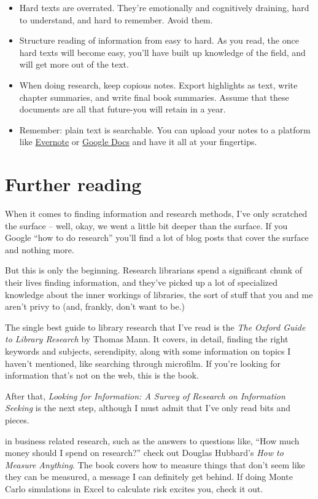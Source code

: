 \begin{itemize}
\item Hard texts are overrated. They're emotionally and cognitively draining, hard to
understand, and hard to remember. Avoid them.

\item Structure reading of information from easy to hard. As you read, the once hard
texts will become easy, you'll have built up knowledge of the field, and will
get more out of the text.

\item When doing research, keep copious notes. Export highlights as text, write
chapter summaries, and write final book summaries. Assume that these documents
are all that future-you will retain in a year.

\item Remember: plain text is searchable. You can upload your notes to a platform
like \href{http://evernote.com/}{Evernote} or \href{http://docs.google.com}{Google Docs} and have it all at your fingertips.
\end{itemize}

\section{Further reading}

When it comes to finding information and research methods, I've only scratched
the surface -- well, okay, we went a little bit deeper than the surface. If you
Google ``how to do research'' you'll find a lot of blog posts that cover the
surface and nothing more.

But this is only the beginning. Research librarians spend a significant chunk of their
lives finding information, and they've picked up a lot of specialized
knowledge about the inner workings of libraries, the sort of stuff that you and
me aren't privy to (and, frankly, don't want to be.)

The single best guide to library research that I've read is the \textit{The
  Oxford Guide to Library Research} by Thomas Mann. It covers, in detail,
finding the right keywords and subjects, serendipity, along with some
information on topics I haven't mentioned, like searching through
microfilm. If you're looking for information that's not on the web, this is the
book.

After that, \textit{Looking for Information: A Survey of Research on Information
  Seeking} is the next step, although I must admit that I've only read bits and
pieces.

 in business related research, such as the
answers to questions like, ``How much money should I spend on research?'' check
out Douglas Hubbard's \textit{How to Measure Anything}. The book covers how to
measure things that don't seem like they can be measured, a message I can
definitely get behind. If doing Monte Carlo simulations in Excel to calculate
risk excites you, check it out.

